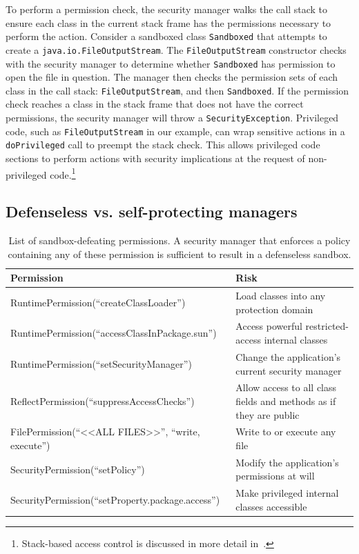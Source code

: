\documentclass{sig-alternate}
\begin{document}
To perform a permission check, the security manager walks the call stack to
ensure each class in the current stack frame has the permissions necessary to
perform the action.  Consider a sandboxed class \texttt{Sandboxed} that attempts
to create a \texttt{java.io.FileOutputStream}. The \texttt{FileOutputStream}
constructor checks with the security manager to determine whether
\texttt{Sandboxed} has permission to open the file in question.  The manager
then checks the permission sets of each class in the call stack:
\texttt{FileOutputStream}, and then \texttt{Sandboxed}.  If the permission check
reaches a class in the stack frame that does not have the correct permissions,
the security manager will throw a \texttt{SecurityException}.  Privileged code,
such as \texttt{FileOutputStream} in our example, can wrap sensitive actions in
a \texttt{doPrivileged} call to preempt the stack check.  This allows privileged
code sections to perform actions with security implications at the request of
non-privileged code.\footnote{Stack-based access control is discussed in more
  detail
  in~\cite{banerjee_stack-based_2005,besson_stack_2004,d._s._wallach_understanding_1998,erlingsson_irm_2000,fournet_stack_2002,pistoia_beyond_2007,zhao_type_2005}.}

\subsection{Defenseless vs. self-protecting managers}
\label{sec:secmanagers}

\begin{table}
\caption{List of sandbox-defeating permissions. A security manager that enforces
a policy containing any of these permission is sufficient to result
\label{tab:defenseless-permissions}
in a defenseless sandbox.}


\centering{}%
\begin{tabular}{ll}
\toprule 
\textbf{Permission} & \textbf{Risk}\tabularnewline
\midrule
RuntimePermission(``createClassLoader'') & Load classes into any protection domain\tabularnewline
RuntimePermission(``accessClassInPackage.sun'') & Access powerful restricted-access internal classes\tabularnewline
RuntimePermission(``setSecurityManager'') & Change the application's current security manager\tabularnewline
ReflectPermission(``suppressAccessChecks'') & Allow access to all class fields and methods as if they are public\tabularnewline
FilePermission(``<\textcompwordmark{}<ALL FILES>\textcompwordmark{}>'',
``write, execute'') & Write to or execute any file\tabularnewline
SecurityPermission(``setPolicy'') & Modify the application's permissions at will\tabularnewline
SecurityPermission(``setProperty.package.access'') & Make privileged internal classes accessible\tabularnewline
\bottomrule
\end{tabular}
\end{table}
\end{document}
